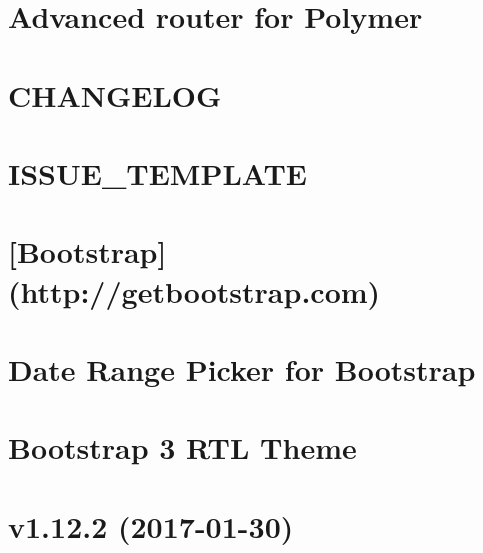 \documentclass[twoside]{book}
\newcommand{\+}{\discretionary{\mbox{\scriptsize$\hookleftarrow$}}{}{}}
\begin{document}
\chapter{Advanced router for Polymer}
\label{md_app_web_bower_components__app__states__r_e_a_d_m_e}

\chapter{C\+H\+A\+N\+G\+E\+L\+OG}
\label{md_app_web_bower_components_bootstrap__c_h_a_n_g_e_l_o_g}

\chapter{I\+S\+S\+U\+E\+\_\+\+T\+E\+M\+P\+L\+A\+TE}
\label{md_app_web_bower_components_bootstrap__i_s_s_u_e__t_e_m_p_l_a_t_e}

\chapter{\mbox{[}Bootstrap\mbox{]}(http\+://getbootstrap.com)}
\label{md_app_web_bower_components_bootstrap__r_e_a_d_m_e}

\chapter{Date Range Picker for Bootstrap}
\label{md_app_web_bower_components_bootstrap-daterangepicker__r_e_a_d_m_e}

\chapter{Bootstrap 3 R\+TL Theme}
\label{md_app_web_bower_components_bootstrap-rtl__r_e_a_d_m_e}

\chapter{v1.12.2 (2017-\/01-\/30)}
\label{md_app_web_bower_components_bootstrap-select__c_h_a_n_g_e_l_o_g}

\end{document}
